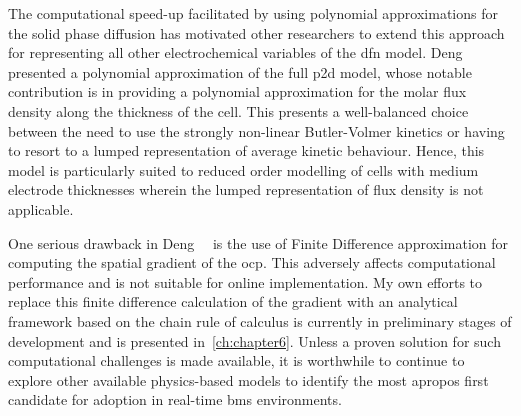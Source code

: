 

The computational  speed-up facilitated  by using polynomial  approximations for
the  solid  phase diffusion  has  motivated  other  researchers to  extend  this
approach for representing  all other electrochemical variables  of the \gls{dfn}
model. Deng~\etal{}~\cite{Deng2018} presented a  polynomial approximation of the
full \gls{p2d}  model, whose notable  contribution is in providing  a polynomial
approximation for  the molar flux  density along the  thickness of the  cell.
This presents a well-balanced choice between the  need to use the strongly
non-linear Butler-Volmer kinetics or having to resort to a lumped representation
of average kinetic behaviour.  Hence, this  model is particularly  suited to
reduced order modelling  of  cells  with  medium  electrode  thicknesses wherein
the  lumped representation of flux density is not applicable.



One  serious  drawback in  Deng~\etal{}~\cite{Deng2018}  is  the use  of  Finite
Difference approximation  for computing the  spatial gradient of  the \gls{ocp}.
This  adversely  affects  computational  performance and  is  not  suitable  for
online  implementation.  My  own  efforts  to  replace  this  finite  difference
calculation of  the gradient  with an  analytical framework  based on  the chain
rule  of calculus  is  currently in  preliminary stages  of  development and  is
presented in~\cref{ch:chapter6}. Unless a proven solution for such computational
challenges is  made available,  it is  worthwhile to  continue to  explore other
available physics-based models to identify  the most apropos first candidate for
adoption in real-time \gls{bms} environments.


